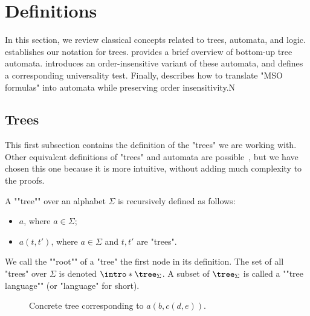 \documentclass[a4paper,UKenglish,cleveref, autoref, thm-restate]{lipics-v2021}
\begin{document}
\section{Definitions} \label{sec:definitions}

In this section, we review classical concepts related to trees, automata, and logic.
 establishes our notation for trees.
 provides a brief overview of bottom-up tree automata.
 introduces an order-insensitive variant of these automata, and
 defines a corresponding universality test.
Finally,  describes how to translate "MSO formulas" into automata while preserving order insensitivity.N
\subsection{Trees}\label{sec:trees}

This first subsection contains the definition of the "trees" we are working with. Other equivalent definitions of "trees" and
automata are possible~\cite{Thomas1997, tata}, but we have chosen this one because it is more intuitive, without adding much complexity to the proofs.

\begin{definition}["Tree"]
	\AP A ""tree"" over an alphabet $\Sigma$ is recursively defined as follows:
	\begin{itemize}
		\item $a$, where $a \in \Sigma$;
		\item $a(t,t')$, where $a \in \Sigma$ and $t, t'$ are "trees".
	\end{itemize}
	We call the ""root"" of a "tree" the first node in its definition.
	The set of all "trees" over $\Sigma$ is denoted $\intro* \tree_{\Sigma}$.
	A subset of $\tree_{\Sigma}$ is called a ""tree language"" (or "language" for short).
\end{definition}

\begin{figure}[h]
	\centering


	\caption{Concrete tree corresponding to $a(b, c(d, e))$.}
\end{figure}
\end{document}
